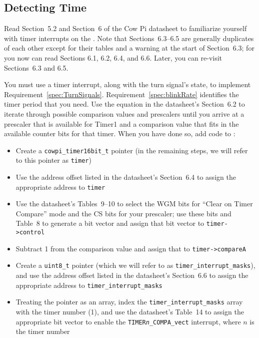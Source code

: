 \subsection{Detecting Time}

Read Section~5.2 and Section~6 of the Cow Pi datasheet to familiarize yourself with timer interrupts on the \developmentboard.
Note that Sections~6.3--6.5 are generally duplicates of each other except for their tables and a warning at the start of Section~6.3;
for you now can read Sections 6.1, 6.2, 6.4, and 6.6.
Later, you can re-visit Sections~6.3 and 6.5.

You must use a timer interrupt, along with the turn signal's state, to implement Requirement~\ref{spec:TurnSignals}.
Requirement~\ref{spec:blinkRate} identifies the timer period that you need.
Use the equation in the datasheet's Section~6.2 to iterate through possible comparison values and prescalers until you arrive at a prescaler that is available for Timer1 and a comparison value that fits in the available counter bits for that timer.
When you have done so, add code to :
\begin{itemize}
    \item Create a \lstinline{cowpi_timer16bit_t} pointer (in the remaining steps, we will refer to this pointer as \lstinline{timer})
    \item Use the address offset listed in the datasheet's Section~6.4 to assign the appropriate address to \lstinline{timer}
    \item Use the datasheet's Tables~9--10 to select the WGM bits for ``Clear on Timer Compare'' mode and the CS bits for your prescaler;
        use these bits and Table~8 to generate a bit vector and assign that bit vector to \lstinline{timer->control}
    \item Subtract 1 from the comparison value and assign that to \lstinline{timer->compareA}
    \item Create a \lstinline{uint8_t} pointer (which we will refer to as \lstinline{timer_interrupt_masks}), and use the address offset listed in the datasheet's Section~6.6 to assign the appropriate address to \lstinline{timer_interrupt_masks}
    \item Treating the pointer as an array, index the \lstinline{timer_interrupt_masks} array with the timer number (1), and use the datasheet's Table~14 to assign the appropriate bit vector to enable the \texttt{TIMER\textit{n}\_COMPA\_vect} interrupt, where $n$ is the timer number
\end{itemize}

